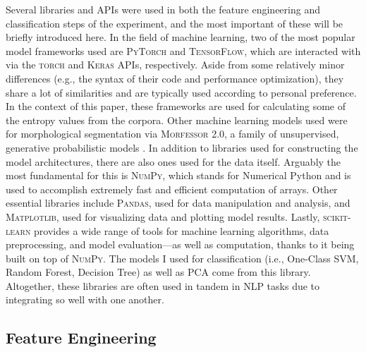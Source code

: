 \documentclass[12pt,a4paper]{article}
\numberwithin{figure}{section}
\numberwithin{table}{section}
\numberwithin{definition}{section}
\begin{document}
Several libraries and APIs were used in both the feature engineering and classification steps of the experiment, and the most important of these will be briefly introduced here. In the field of machine learning, two of the most popular model frameworks used are \textsc{PyTorch} and \textsc{TensorFlow}, which are interacted with via the \textsc{torch} and \textsc{Keras} APIs, respectively. Aside from some relatively minor differences (e.g., the syntax of their code and performance optimization), they share a lot of similarities and are typically used according to personal preference. In the context of this paper, these frameworks are used for calculating some of the entropy values from the corpora. Other machine learning models used were for morphological segmentation via \textsc{Morfessor 2.0}, a family of unsupervised, generative probabilistic models \parencite{Virpioja2013inproceedings}. In addition to libraries used for constructing the model architectures, there are also ones used for the data itself. Arguably the most fundamental for this is \textsc{NumPy}, which stands for Numerical Python and is used to accomplish extremely fast and efficient computation of arrays. Other essential libraries include \textsc{Pandas}, used for data manipulation and analysis, and \textsc{Matplotlib}, used for visualizing data and plotting model results. Lastly, \textsc{scikit-learn} provides a wide range of tools for machine learning algorithms, data preprocessing, and model evaluation---as well as computation, thanks to it being built on top of \textsc{NumPy}. The models I used for classification (i.e., One-Class SVM, Random Forest, Decision Tree) as well as PCA come from this library. Altogether, these libraries are often used in tandem in NLP tasks due to integrating so well with one another.

\subsection{Feature Engineering}
\label{ssec:featureengineering}

\end{document}
